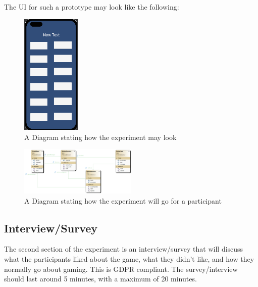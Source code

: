 \documentclass[conference]{IEEEtran}
\begin{document}
The UI for such a prototype may look like the following:

\begin{figure}[H]
\begin{center}
\includegraphics[width = 0.25\textwidth, ]{Sim1}
\caption{A Diagram stating how the experiment may look}
\label{tab:figure1}
\end{center}
\end{figure}

\begin{figure}[H]
\includegraphics[width = 0.5\textwidth]{UMLProcess}
\caption{A Diagram stating how the experiment will go for a participant}
\label{tab:figure3}
\end{figure}

\subsection{Interview/Survey}
The second section of the experiment is an interview/survey that will discuss what the participants liked about the game, what they didn't like, and how they normally go about gaming. This is GDPR compliant. The survey/interview should last around 5 minutes, with a maximum of 20 minutes.
\end{document}
